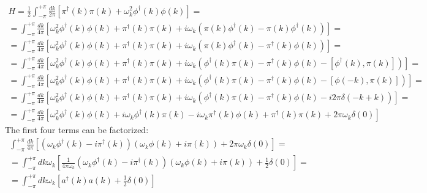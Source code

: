 \documentclass{article}
\begin{document}
\begin{equation}
\begin{gathered}
    H = \frac{1}{2}
    \int_{-\pi}^{+\pi} \frac{dk}{2\pi}
    \left[
        \pi^\dagger(k)\pi(k) + 
        \omega_k^2
        \phi^\dagger(k)\phi(k)
    \right] = \\
    = \int_{-\pi}^{+\pi} \frac{dk}{4\pi}
    \left[
        \omega_k^2
        \phi^\dagger(k)\phi(k) +
        \pi^\dagger(k)\pi(k) + 
        i\omega_k\left(\pi(k)\phi^\dagger(k) - \pi(k)\phi^\dagger(k)\right)
    \right] = \\
    = \int_{-\pi}^{+\pi} \frac{dk}{4\pi}
    \left[
        \omega_k^2
        \phi^\dagger(k)\phi(k) +
        \pi^\dagger(k)\pi(k) + 
        i\omega_k\left(\pi(k)\phi^\dagger(k) - \pi^\dagger(k)\phi(k)\right)
    \right] = \\
    = \int_{-\pi}^{+\pi} \frac{dk}{4\pi}
    \left[
        \omega_k^2
        \phi^\dagger(k)\phi(k) +
        \pi^\dagger(k)\pi(k) + 
        i\omega_k\left(\phi^\dagger(k)\pi(k) - \pi^\dagger(k)\phi(k) - \left[\phi^\dagger(k), \pi(k)\right]\right)
    \right] = \\
    = \int_{-\pi}^{+\pi} \frac{dk}{4\pi}
    \left[
        \omega_k^2
        \phi^\dagger(k)\phi(k) +
        \pi^\dagger(k)\pi(k) + 
        i\omega_k\left(\phi^\dagger(k)\pi(k) - \pi^\dagger(k)\phi(k) - \left[\phi(-k), \pi(k)\right]\right)
    \right] = \\
    = \int_{-\pi}^{+\pi} \frac{dk}{4\pi}
    \left[
        \omega_k^2
        \phi^\dagger(k)\phi(k) +
        \pi^\dagger(k)\pi(k) + 
        i\omega_k\left(\phi^\dagger(k)\pi(k) - \pi^\dagger(k)\phi(k) - i2\pi\delta(-k+k)\right)
    \right] = \\
    = \int_{-\pi}^{+\pi} \frac{dk}{4\pi}
    \left[
        \omega_k^2
        \phi^\dagger(k)\phi(k) +
        i\omega_k\phi^\dagger(k)\pi(k) - i\omega_k\pi^\dagger(k)\phi(k) + 
        \pi^\dagger(k)\pi(k) + 2\pi\omega_k\delta(0)
    \right]
\end{gathered}
\end{equation}
The first four terms can be factorized:
\begin{equation}
\begin{gathered}
    \int_{-\pi}^{+\pi} \frac{dk}{4\pi}
    \left[
        \left(\omega_k\phi^\dagger(k) - i\pi^\dagger(k)\right)
        \left(\omega_k\phi(k) + i\pi(k)\right)
        +2\pi\omega_k\delta(0)   
    \right] = \\
    = \int_{-\pi}^{+\pi}  dk \omega_k
    \left[
        \frac{1}{4\pi\omega_k}\left(\omega_k\phi^\dagger(k) - i\pi^\dagger(k)\right)
        \left(\omega_k\phi(k) + i\pi(k)\right)
        + \frac{1}{2}\delta(0)   
    \right] = \\
    = \int_{-\pi}^{+\pi}  dk \omega_k
    \left[a^\dagger(k)a(k)+ \frac{1}{2}\delta(0)   
    \right]
\end{gathered}
\end{equation}
\end{document}
